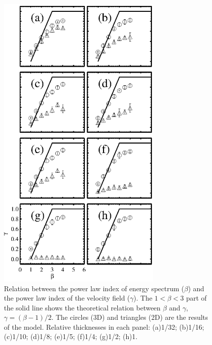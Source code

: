 \documentclass[iop,revtex4]{emulateapj}
\begin{document}
\begin{figure}[htbp]
\centering
\includegraphics[width=8cm]{beta_gamma_all.eps}
\caption{Relation between the power law index of energy spectrum ($\beta$) and the power law index of the velocity field ($\gamma$). The $1< \beta <3$ part of the solid line shows the theoretical relation between $\beta$ and $\gamma$, $\gamma=(\beta-1)/2$. The circles (3D) and triangles (2D) are the results of the model. Relative thicknesses in each panel: (a)1/32; (b)1/16; (c)1/10; (d)1/8; (e)1/5; (f)1/4; (g)1/2; (h)1.
\label{compare_4_8_16_32_64_128}}
\end{figure}
\end{document}
